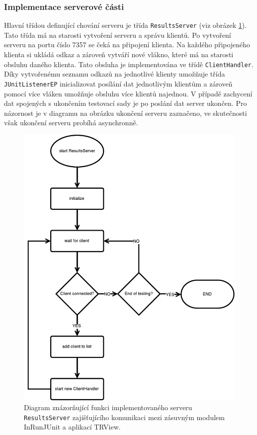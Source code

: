      \subsubsection{Implementace serverové části}
	Hlavní třídou definující chování serveru je třída \texttt{ResultsServer} (viz obrázek \ref{fig:resultsserver_flowchart}). Tato třída má na starosti vytvoření serveru a správu klientů. Po vytvoření serveru na portu číslo 7357 se čeká na připojení klienta. Na každého připojeného klienta si ukládá odkaz a zároveň vytváří nové vlákno, které má na starosti obsluhu daného klienta. Tato obsluha je implementována ve třídě \texttt{ClientHandler}. Díky vytvořenému seznamu odkazů na jednotlivé klienty umožňuje třída \texttt{JUnitListenerEP} inicializovat posílání dat jednotlivým klientům a zároveň pomocí více vláken umožňuje obsluhu více klientů najednou. V případě zachycení dat spojených s ukončením testovací sady je po poslání dat server ukončen. Pro názornost je v diagramu na obrázku ukončení serveru zaznačeno, ve skutečnosti však ukončení serveru probíhá asynchronně.
	
	\begin{figure}
	  \includegraphics[width=\textwidth, height=\textheight, keepaspectratio, center]{obrazky-figures/inrunjunit_resultsserver_flowchart.pdf}
	  \caption{Diagram znázorňující funkci implementovaného serveru \texttt{ResultsServer} zajišťujícího komunikaci mezi zásuvným modulem InRunJUnit a aplikací TRView.}
	  \label{fig:resultsserver_flowchart}
	\end{figure}

